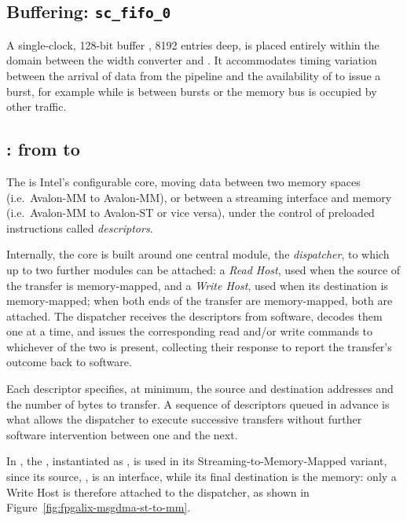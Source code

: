 \subsection{Buffering: \texttt{sc\_fifo\_0}}
\label{subsec:fpgalix-sc-fifo}

A single-clock, 128-bit buffer , 8192 entries deep, is placed entirely within the  domain between the width converter and . It accommodates timing variation between the arrival of data from the pipeline and the availability of  to issue a burst, for example while  is between bursts or the  memory bus is occupied by other traffic.

\subsection{: from  to }
\label{subsec:fpgalix-msgdma}

The  is Intel's configurable   core, moving data between two memory spaces (i.e.\ Avalon-MM to Avalon-MM), or between a streaming interface and memory (i.e.\ Avalon-MM to Avalon-ST or vice versa), under the control of preloaded instructions called \emph{descriptors}.

Internally, the core is built around one central module, the \emph{dispatcher}, to which up to two further modules can be attached: a \emph{Read Host}, used when the source of the transfer is memory-mapped, and a \emph{Write Host}, used when its destination is memory-mapped; when both ends of the transfer are memory-mapped, both are attached. The dispatcher receives the descriptors from software, decodes them one at a time, and issues the corresponding read and/or write commands to whichever of the two is present, collecting their response to report the transfer's outcome back to software.

Each descriptor specifies, at minimum, the source and destination addresses and the number of bytes to transfer. A sequence of descriptors queued in advance is what allows the dispatcher to execute successive transfers without further software intervention between one and the next.

In , the , instantiated as , is used in its Streaming-to-Memory-Mapped variant, since its source, , is an  interface, while its final destination is the  memory: only a Write Host is therefore attached to the dispatcher, as shown in Figure~\ref{fig:fpgalix-msgdma-st-to-mm}.

